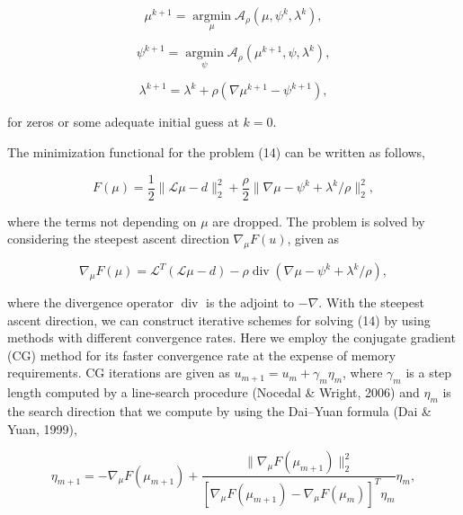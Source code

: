 \documentclass{article}
\begin{document}
\begin{equation}
\mu^{k+1} = \operatorname*{argmin}_{\mu} \mathcal{A}_\rho(\mu, \psi^k, \lambda^k),
\tag{14}
\end{equation}

\begin{equation}
\psi^{k+1} = \operatorname*{argmin}_{\psi} \mathcal{A}_\rho(\mu^{k+1}, \psi, \lambda^k),
\tag{15}
\end{equation}

\begin{equation}
\lambda^{k+1} = \lambda^k + \rho(\nabla\mu^{k+1} - \psi^{k+1}),
\tag{16}
\end{equation}

for zeros or some adequate initial guess at $k = 0$.

The minimization functional for the problem (14) can be written as follows,

\begin{equation}
F(\mu) = \frac{1}{2} \|\mathcal{L}\mu - d\|_2^2 + \frac{\rho}{2} \|\nabla\mu - \psi^k + \lambda^k/\rho\|_2^2,
\tag{17}
\end{equation}

where the terms not depending on $\mu$ are dropped. The problem is solved by considering the steepest ascent direction $\nabla_\mu F(u)$, given as

\begin{equation}
\nabla_\mu F(\mu) = \mathcal{L}^T(\mathcal{L}\mu - d) - \rho \operatorname{div}(\nabla\mu - \psi^k + \lambda^k/\rho),
\tag{18}
\end{equation}

where the divergence operator $\operatorname{div}$ is the adjoint to $-\nabla$. With the steepest ascent direction, we can construct iterative schemes for solving (14) by using methods with different convergence rates. Here we employ the conjugate gradient (CG) method for its faster convergence rate at the expense of memory requirements. CG iterations are given as $u_{m+1} = u_m + \gamma_m \eta_m$, where $\gamma_m$ is a step length computed by a line-search procedure (Nocedal \& Wright, 2006) and $\eta_m$ is the search direction that we compute by using the Dai–Yuan formula (Dai \& Yuan, 1999),

\begin{equation}
\eta_{m+1} = -\nabla_\mu F(\mu_{m+1}) + \frac{\|\nabla_\mu F(\mu_{m+1})\|_2^2}{[\nabla_\mu F(\mu_{m+1}) - \nabla_\mu F(\mu_m)]^T \eta_m} \eta_m,
\tag{19}
\end{equation}
\end{document}
